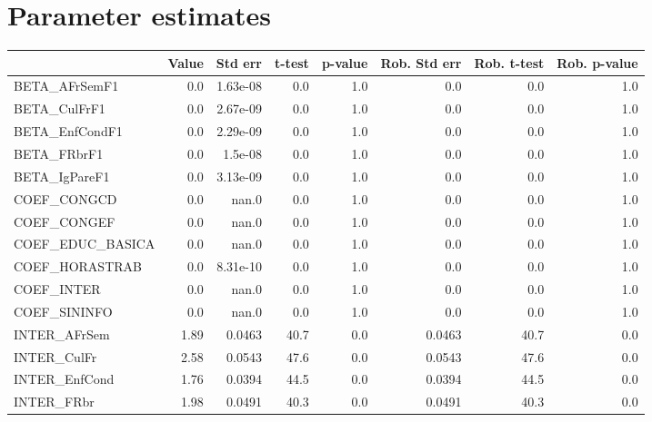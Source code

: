 \section{Parameter estimates}
\begin{tabular}{lrrrrrrr}
\toprule
{} &  Value &  Std err &  t-test &  p-value &  Rob. Std err &  Rob. t-test &  Rob. p-value \\
\midrule
BETA\_AFrSemF1      &    0.0 & 1.63e-08 &     0.0 &      1.0 &           0.0 &          0.0 &           1.0 \\
BETA\_CulFrF1       &    0.0 & 2.67e-09 &     0.0 &      1.0 &           0.0 &          0.0 &           1.0 \\
BETA\_EnfCondF1     &    0.0 & 2.29e-09 &     0.0 &      1.0 &           0.0 &          0.0 &           1.0 \\
BETA\_FRbrF1        &    0.0 &  1.5e-08 &     0.0 &      1.0 &           0.0 &          0.0 &           1.0 \\
BETA\_IgPareF1      &    0.0 & 3.13e-09 &     0.0 &      1.0 &           0.0 &          0.0 &           1.0 \\
COEF\_CONGCD        &    0.0 &    nan.0 &     0.0 &      1.0 &           0.0 &          0.0 &           1.0 \\
COEF\_CONGEF        &    0.0 &    nan.0 &     0.0 &      1.0 &           0.0 &          0.0 &           1.0 \\
COEF\_EDUC\_BASICA   &    0.0 &    nan.0 &     0.0 &      1.0 &           0.0 &          0.0 &           1.0 \\
COEF\_HORASTRAB     &    0.0 & 8.31e-10 &     0.0 &      1.0 &           0.0 &          0.0 &           1.0 \\
COEF\_INTER         &    0.0 &    nan.0 &     0.0 &      1.0 &           0.0 &          0.0 &           1.0 \\
COEF\_SININFO       &    0.0 &    nan.0 &     0.0 &      1.0 &           0.0 &          0.0 &           1.0 \\
INTER\_AFrSem       &   1.89 &   0.0463 &    40.7 &      0.0 &        0.0463 &         40.7 &           0.0 \\
INTER\_CulFr        &   2.58 &   0.0543 &    47.6 &      0.0 &        0.0543 &         47.6 &           0.0 \\
INTER\_EnfCond      &   1.76 &   0.0394 &    44.5 &      0.0 &        0.0394 &         44.5 &           0.0 \\
INTER\_FRbr         &   1.98 &   0.0491 &    40.3 &      0.0 &        0.0491 &         40.3 &           0.0 \\

\end{tabular}
